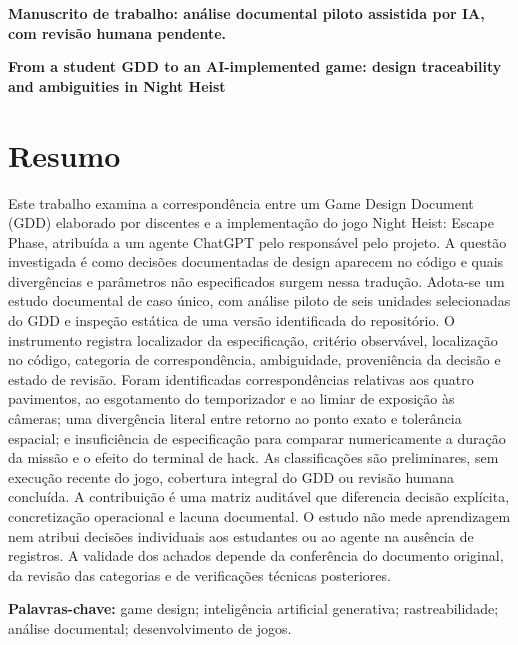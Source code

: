 \maketitle
\noindent\textbf{Manuscrito de trabalho: análise documental piloto assistida por IA, com revisão humana pendente.}

\begin{center}\textbf{From a student GDD to an AI-implemented game: design traceability and ambiguities in Night Heist}\end{center}
\section*{\centering Resumo}
\begin{resumotexto}
Este trabalho examina a correspondência entre um Game Design Document (GDD) elaborado por discentes e a implementação do jogo Night Heist: Escape Phase, atribuída a um agente ChatGPT pelo responsável pelo projeto. A questão investigada é como decisões documentadas de design aparecem no código e quais divergências e parâmetros não especificados surgem nessa tradução. Adota-se um estudo documental de caso único, com análise piloto de seis unidades selecionadas do GDD e inspeção estática de uma versão identificada do repositório. O instrumento registra localizador da especificação, critério observável, localização no código, categoria de correspondência, ambiguidade, proveniência da decisão e estado de revisão. Foram identificadas correspondências relativas aos quatro pavimentos, ao esgotamento do temporizador e ao limiar de exposição às câmeras; uma divergência literal entre retorno ao ponto exato e tolerância espacial; e insuficiência de especificação para comparar numericamente a duração da missão e o efeito do terminal de hack. As classificações são preliminares, sem execução recente do jogo, cobertura integral do GDD ou revisão humana concluída. A contribuição é uma matriz auditável que diferencia decisão explícita, concretização operacional e lacuna documental. O estudo não mede aprendizagem nem atribui decisões individuais aos estudantes ou ao agente na ausência de registros. A validade dos achados depende da conferência do documento original, da revisão das categorias e de verificações técnicas posteriores.

\end{resumotexto}
\noindent\textbf{Palavras-chave:} game design; inteligência artificial generativa; rastreabilidade; análise documental; desenvolvimento de jogos.

